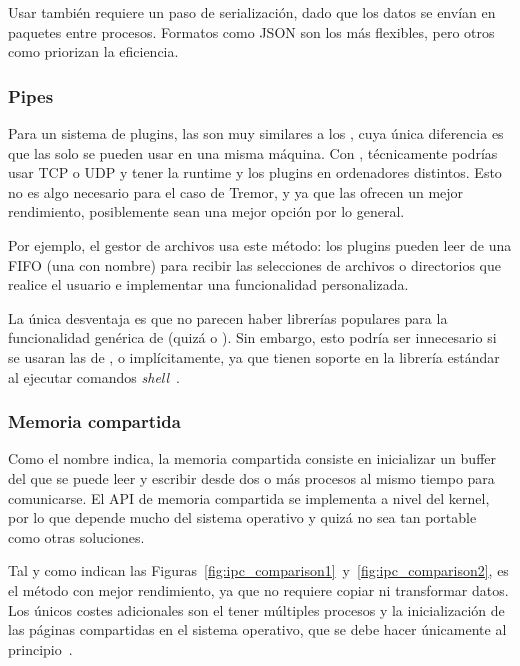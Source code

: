 Usar \sockets también requiere un paso de serialización, dado que los datos se
envían en paquetes entre procesos. Formatos como JSON son los más flexibles,
pero otros como  priorizan la eficiencia.

\subsubsection{Pipes}

Para un sistema de plugins, las \pipes son muy similares a los \sockets, cuya
única diferencia es que las \pipes solo se pueden usar en una misma máquina. Con
\sockets, técnicamente podrías usar TCP o UDP y tener la runtime y los plugins
en ordenadores distintos. Esto no es algo necesario para el caso de Tremor, y ya
que las \pipes ofrecen un mejor rendimiento, posiblemente sean una mejor opción
por lo general.

Por ejemplo, el gestor de archivos  usa este método: los plugins
pueden leer de una FIFO (una \pipe con nombre) para recibir las selecciones de
archivos o directorios que realice el usuario e implementar una funcionalidad
personalizada.

La única desventaja es que no parecen haber librerías populares para la
funcionalidad genérica de \pipes (quizá  o
). Sin embargo, esto podría ser innecesario si se usaran las
\pipes de \stdin, \stdout o \stderr implícitamente, ya que tienen soporte en la
librería estándar al ejecutar comandos \emph{shell}~\cite[Pipes]{rustexample}.

\subsubsection{Memoria compartida}

Como el nombre indica, la memoria compartida consiste en inicializar un buffer
del que se puede leer y escribir desde dos o más procesos al mismo tiempo para
comunicarse. El API de memoria compartida se implementa a nivel del kernel, por
lo que depende mucho del sistema operativo y quizá no sea tan portable como
otras soluciones.

Tal y como indican las
Figuras~\ref{fig:ipc_comparison1}~y~\ref{fig:ipc_comparison2}, es el método con
mejor rendimiento, ya que no requiere copiar ni transformar datos. Los únicos
costes adicionales son el tener múltiples procesos y la inicialización de las
páginas compartidas en el sistema operativo, que se debe hacer únicamente al
principio~\cite{sharedmemperf}.

